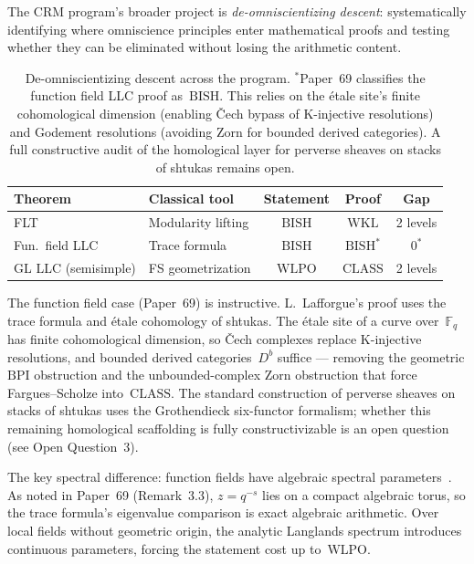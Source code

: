 \documentclass[12pt, a4paper]{article}
\theoremstyle{plain}
\theoremstyle{definition}
\theoremstyle{remark}
\newcommand{\BISH}{\mathrm{BISH}}
\newcommand{\WKL}{\mathrm{WKL}}
\newcommand{\WLPO}{\mathrm{WLPO}}
\newcommand{\CLASS}{\mathrm{CLASS}}
\newcommand{\BPI}{\mathrm{BPI}}
\begin{document}
The CRM program's broader project is \emph{de-omniscientizing
descent}: systematically identifying where omniscience principles
enter mathematical proofs and testing whether they can be eliminated
without losing the arithmetic content.

\begin{table}[h]
\centering
\begin{tabular}{llccc}
\toprule
\textbf{Theorem} & \textbf{Classical tool}
  & \textbf{Statement} & \textbf{Proof}
  & \textbf{Gap} \\
\midrule
FLT & Modularity lifting & $\BISH$ & $\WKL$ & 2 levels \\
Fun.\ field LLC & Trace formula & $\BISH$ & $\BISH^*$ & $0^*$ \\
GL LLC (semisimple) & FS geometrization & $\WLPO$ & $\CLASS$ & 2 levels \\
\bottomrule
\end{tabular}
\caption{De-omniscientizing descent across the program.
${}^*$Paper~69 classifies the function field LLC proof as~$\BISH$.
This relies on the \'etale site's finite cohomological dimension
(enabling \v{C}ech bypass of K-injective resolutions) and
Godement resolutions (avoiding Zorn for bounded derived categories).
A full constructive audit of the homological layer for perverse
sheaves on stacks of shtukas remains open.}
\label{tab:descent-comparison}
\end{table}

The function field case (Paper~69) is instructive.  L.~Lafforgue's
proof uses the trace formula and \'etale cohomology of shtukas.
The \'etale site of a curve over~$\mathbb{F}_q$ has finite
cohomological dimension, so \v{C}ech complexes replace
K-injective resolutions, and bounded derived categories~$D^b$
suffice --- removing the geometric $\BPI$ obstruction and the
unbounded-complex Zorn obstruction that force Fargues--Scholze
into~$\CLASS$.  The standard construction of perverse sheaves on
stacks of shtukas uses the Grothendieck six-functor formalism;
whether this remaining homological scaffolding is fully
constructivizable is an open question (see Open Question~3).

The key spectral difference: function fields have algebraic
spectral parameters~\cite{deligne-weil2}.  As noted in Paper~69
(Remark~3.3), $z = q^{-s}$ lies on a compact algebraic torus, so
the trace formula's eigenvalue comparison is exact algebraic
arithmetic.  Over local fields without geometric origin, the
analytic Langlands spectrum introduces continuous parameters,
forcing the statement cost up to~$\WLPO$.
\end{document}
